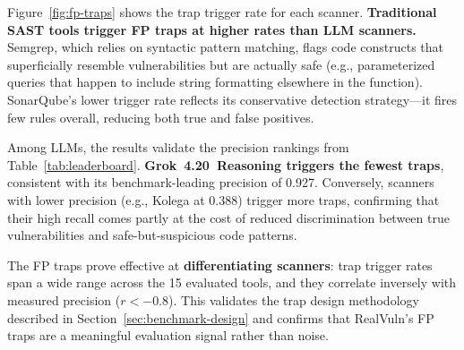 Figure~\ref{fig:fp-traps} shows the trap trigger rate for each scanner.
\textbf{Traditional SAST tools trigger FP traps at higher rates than LLM scanners.}
Semgrep, which relies on syntactic pattern matching, flags code constructs that superficially resemble vulnerabilities but are actually safe (e.g., parameterized queries that happen to include string formatting elsewhere in the function).
SonarQube's lower trigger rate reflects its conservative detection strategy---it fires few rules overall, reducing both true and false positives.

Among LLMs, the results validate the precision rankings from Table~\ref{tab:leaderboard}.
\textbf{Grok~4.20~Reasoning triggers the fewest traps}, consistent with its benchmark-leading precision of 0.927.
Conversely, scanners with lower precision (e.g., Kolega at 0.388) trigger more traps, confirming that their high recall comes partly at the cost of reduced discrimination between true vulnerabilities and safe-but-suspicious code patterns.

The FP traps prove effective at \textbf{differentiating scanners}: trap trigger rates span a wide range across the 15 evaluated tools, and they correlate inversely with measured precision ($r < -0.8$).
This validates the trap design methodology described in Section~\ref{sec:benchmark-design} and confirms that RealVuln's FP traps are a meaningful evaluation signal rather than noise.
